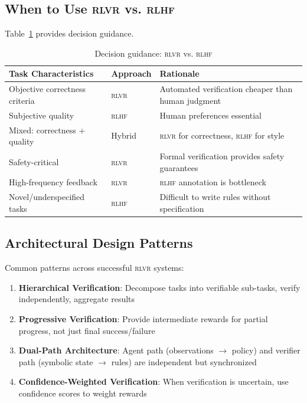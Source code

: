 \documentclass[11pt,a4paper]{article}
\newcommand{\rlvr}{\textsc{rlvr}}
\newcommand{\rlhf}{\textsc{rlhf}}
\begin{document}
\subsection{When to Use \rlvr{} vs. \rlhf{}}
\label{sec:when_to_use}

Table~\ref{tab:when_to_use} provides decision guidance.

\begin{table}[t]
\centering
\caption{Decision guidance: \rlvr{} vs. \rlhf{}}
\label{tab:when_to_use}
\small
\begin{tabular}{@{}p{6cm}lp{6cm}@{}}
\toprule
\textbf{Task Characteristics} & \textbf{Approach} & \textbf{Rationale} \\
\midrule
Objective correctness criteria & \rlvr{} & Automated verification cheaper than human judgment \\
Subjective quality & \rlhf{} & Human preferences essential \\
Mixed: correctness + quality & Hybrid & \rlvr{} for correctness, \rlhf{} for style \\
Safety-critical & \rlvr{} & Formal verification provides safety guarantees \\
High-frequency feedback & \rlvr{} & \rlhf{} annotation is bottleneck \\
Novel/underspecified tasks & \rlhf{} & Difficult to write rules without specification \\
\bottomrule
\end{tabular}
\end{table}

\subsection{Architectural Design Patterns}
\label{sec:design_patterns}

Common patterns across successful \rlvr{} systems:

\begin{enumerate}[leftmargin=*]
    \item \textbf{Hierarchical Verification}: Decompose tasks into verifiable sub-tasks, verify independently, aggregate results
    
    \item \textbf{Progressive Verification}: Provide intermediate rewards for partial progress, not just final success/failure
    
    \item \textbf{Dual-Path Architecture}: Agent path (observations $\rightarrow$ policy) and verifier path (symbolic state $\rightarrow$ rules) are independent but synchronized
    
    \item \textbf{Confidence-Weighted Verification}: When verification is uncertain, use confidence scores to weight rewards
\end{enumerate}
\end{document}
